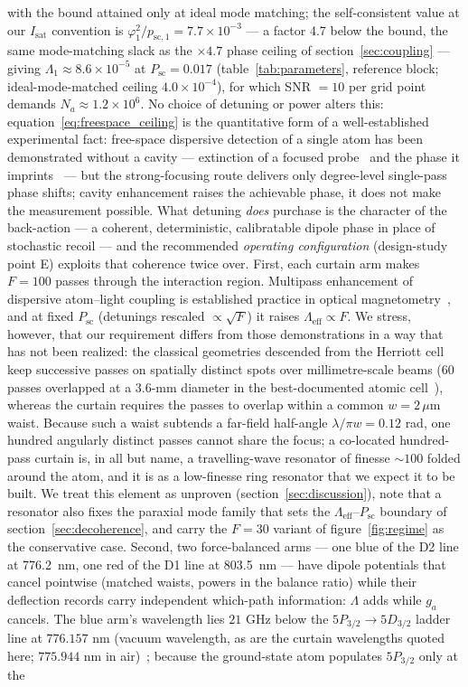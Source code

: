 \documentclass[11pt,a4paper]{article}
\begin{document}
with the bound attained only at ideal mode matching; the self-consistent value at our $I_\text{sat}$ convention is $\varphi_1^2/p_{\text{sc},1} = 7.7\times 10^{-3}$ --- a factor 4.7 below the bound, the same mode-matching slack as the $\times 4.7$ phase ceiling of section~\ref{sec:coupling} --- giving $\Lambda_1 \approx 8.6\times 10^{-5}$ at $P_\text{sc} = 0.017$ (table~\ref{tab:parameters}, reference block; ideal-mode-matched ceiling $4.0\times 10^{-4}$), for which SNR $= 10$ per grid point demands $N_a \approx 1.2\times 10^6$. No choice of detuning or power alters this: equation~\eqref{eq:freespace_ceiling} is the quantitative form of a well-established experimental fact: free-space dispersive detection of a single atom has been demonstrated without a cavity --- extinction of a focused probe~\cite{Tey2008} and the phase it imprints~\cite{Aljunid2009} --- but the strong-focusing route delivers only degree-level single-pass phase shifts; cavity enhancement raises the achievable phase, it does not make the measurement possible. What detuning \emph{does} purchase is the character of the back-action --- a coherent, deterministic, calibratable dipole phase in place of stochastic recoil --- and the recommended \emph{operating configuration} (design-study point E) exploits that coherence twice over. First, each curtain arm makes $F = 100$ passes through the interaction region. Multipass enhancement of dispersive atom--light coupling is established practice in optical magnetometry~\cite{Sheng2013, Lucivero2021}, and at fixed $P_\text{sc}$ (detunings rescaled $\propto\sqrt{F}$) it raises $\Lambda_\text{eff} \propto F$. We stress, however, that our requirement differs from those demonstrations in a way that has not been realized: the classical geometries descended from the Herriott cell~\cite{Herriott1964} keep successive passes on spatially distinct spots over millimetre-scale beams (60 passes overlapped at a 3.6-mm diameter in the best-documented atomic cell~\cite{Lucivero2021}), whereas the curtain requires the passes to overlap within a common $w = 2\,\mu$m waist. Because such a waist subtends a far-field half-angle $\lambda/\pi w = 0.12$ rad, one hundred angularly distinct passes cannot share the focus; a co-located hundred-pass curtain is, in all but name, a travelling-wave resonator of finesse $\sim 100$ folded around the atom, and it is as a low-finesse ring resonator that we expect it to be built. We treat this element as unproven (section~\ref{sec:discussion}), note that a resonator also fixes the paraxial mode family that sets the $\Lambda_\text{eff}$--$P_\text{sc}$ boundary of section~\ref{sec:decoherence}, and carry the $F = 30$ variant of figure~\ref{fig:regime} as the conservative case. Second, two force-balanced arms --- one blue of the D2 line at 776.2~nm, one red of the D1 line at 803.5~nm --- have dipole potentials that cancel pointwise (matched waists, powers in the balance ratio) while their deflection records carry independent which-path information: $\Lambda$ adds while $g_a$ cancels. The blue arm's wavelength lies $21$ GHz below the $5P_{3/2} \to 5D_{3/2}$ ladder line at $776.157$ nm (vacuum wavelength, as are the curtain wavelengths quoted here; $775.944$ nm in air)~\cite{NIST_ASD}; because the ground-state atom populates $5P_{3/2}$ only at the 
\end{document}
